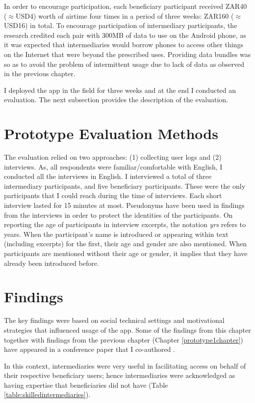 In order to encourage participation, each beneficiary participant received ZAR40 ($\approx$USD4) worth of airtime four times in a period of three weeks: ZAR160 ($\approx$USD16) in total. To encourage participation of intermediary participants, the research credited each pair with 300MB of data to use on the Android phone, as it was expected that intermediaries would borrow phones to access other things on the Internet that were beyond the prescribed uses. Providing data bundles was so as to avoid the problem of intermittent usage due to lack of data as observed in the previous chapter.

I deployed the app in the field for three weeks and at the end I conducted an evaluation. The next subsection provides the description of the evaluation.
\section{Prototype Evaluation Methods}
The evaluation relied on two approaches: (1) collecting user logs and (2) interviews. As, all respondents were familiar/comfortable with English, I conducted all the interviews in English. I interviewed a total of three intermediary participants, and five beneficiary participants. These were the only participants that I could reach during the time of interviews. Each short interview lasted for 15 minutes at most. Pseudonyms have been used in findings from the interviews in order to protect the identities of the participants. On reporting the age of participants in interview excerpts, the notation \emph{yrs} refers to years. When the participant's name is introduced or appearing within text (including excerpts) for the first, their age and gender are also mentioned. When participants are mentioned without their age or gender, it implies that they have already been introduced before. 
\section{Findings}
The key findings were based on social technical settings and motivational strategies that influenced usage of the app. Some of the findings from this chapter together with findings from the previous chapter (Chapter \ref{prototype1chapter}) have appeared in a conference paper that I co-authored \citep{katule2016leveraging}.

In this context, intermediaries were very useful in facilitating access on behalf of their respective beneficiary users; hence intermediaries were acknowledged as having expertise that beneficiaries did not have (Table \ref{table:skilledintermediaries}).

